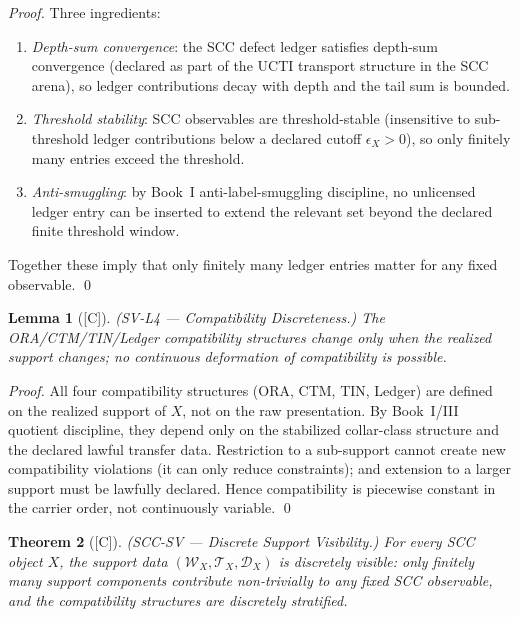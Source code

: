 \documentclass[12pt,oneside]{amsbook}
\theoremstyle{plain}
\newtheorem{theorem}{Theorem}[section]
\newtheorem{lemma}[theorem]{Lemma}
\theoremstyle{definition}
\theoremstyle{remark}
\newcommand{\status}[1]{\textup{[#1]}}
\begin{document}
\begin{proof}
Three ingredients:
\begin{enumerate}[label=\textup{(\arabic*)}]
 \item \emph{Depth-sum convergence}: the SCC defect ledger
 satisfies depth-sum convergence (declared as part of the
 UCTI transport structure in the SCC arena), so ledger
 contributions decay with depth and the tail sum is bounded.
 \item \emph{Threshold stability}: SCC observables are
 threshold-stable (insensitive to sub-threshold ledger
 contributions below a declared cutoff $\epsilon_X > 0$),
 so only finitely many entries exceed the threshold.
 \item \emph{Anti-smuggling}: by Book~I anti-label-smuggling
 discipline, no unlicensed ledger entry can be inserted to
 extend the relevant set beyond the declared finite threshold
 window.
\end{enumerate}
Together these imply that only finitely many ledger entries
matter for any fixed observable. \qed
\end{proof}

\begin{lemma}[\status{C}]\label{lem:scc-sv-l4}
\textup{(SV-L4 --- Compatibility Discreteness.)}
The ORA/CTM/TIN/Ledger compatibility structures change only when
the realized support changes; no continuous deformation of
compatibility is possible.
\end{lemma}

\begin{proof}
All four compatibility structures (ORA, CTM, TIN, Ledger) are
defined on the realized support of $X$, not on the raw
presentation. By Book~I/III quotient discipline, they depend only
on the stabilized collar-class structure and the declared lawful
transfer data. Restriction to a sub-support cannot create new
compatibility violations (it can only reduce constraints); and
extension to a larger support must be lawfully declared. Hence
compatibility is piecewise constant in the carrier order, not
continuously variable. \qed
\end{proof}

\begin{theorem}[\status{C}]\label{thm:scc-sv}
\textup{(SCC-SV --- Discrete Support Visibility.)}
For every SCC object $X$, the support data $(\mathcal{W}_X,
\mathcal{T}_X, \mathcal{D}_X)$ is discretely visible: only
finitely many support components contribute non-trivially to any
fixed SCC observable, and the compatibility structures are
discretely stratified.
\end{theorem}
\end{document}
